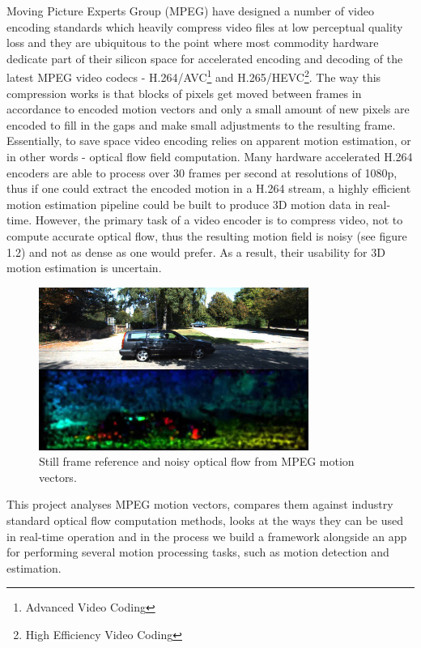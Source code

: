 \documentclass[11pt,english]{report}
\begin{document}
Moving Picture Experts Group (MPEG) have designed a number of video encoding standards which heavily compress video files at low perceptual quality loss and they are ubiquitous to the point where most commodity hardware dedicate part of their silicon space for accelerated encoding and decoding of the latest MPEG video codecs - H.264/AVC\footnote{Advanced Video Coding}\cite{h264} and H.265/HEVC\footnote{High Efficiency Video Coding}\cite{h265}. The way this compression works is that blocks of pixels get moved between frames in accordance to encoded motion vectors and only a small amount of new pixels are encoded to fill in the gaps and make small adjustments to the resulting frame. Essentially, to save space video encoding relies on apparent motion estimation, or in other words - optical flow field computation. Many hardware accelerated H.264 encoders are able to process over 30 frames per second at resolutions of 1080p, thus if one could extract the encoded motion in a H.264 stream, a highly efficient motion estimation pipeline could be built to produce 3D motion data in real-time. However, the primary task of a video encoder is to compress video, not to compute accurate optical flow, thus the resulting motion field is noisy\cite{1334181} (see figure 1.2) and not as dense as one would prefer. As a result, their usability for 3D motion estimation is uncertain.

\begin{figure}[!ht]
	\centering
	\includegraphics[width=250pt]{docs/report/mpeg-mvecs.jpg}
	\caption{\centering Still frame reference and noisy optical flow from MPEG motion vectors.}
\end{figure}

This project analyses MPEG motion vectors, compares them against industry standard optical flow computation methods, looks at the ways they can be used in real-time operation and in the process we build a framework alongside an app for performing several motion processing tasks, such as motion detection and estimation.
\end{document}
